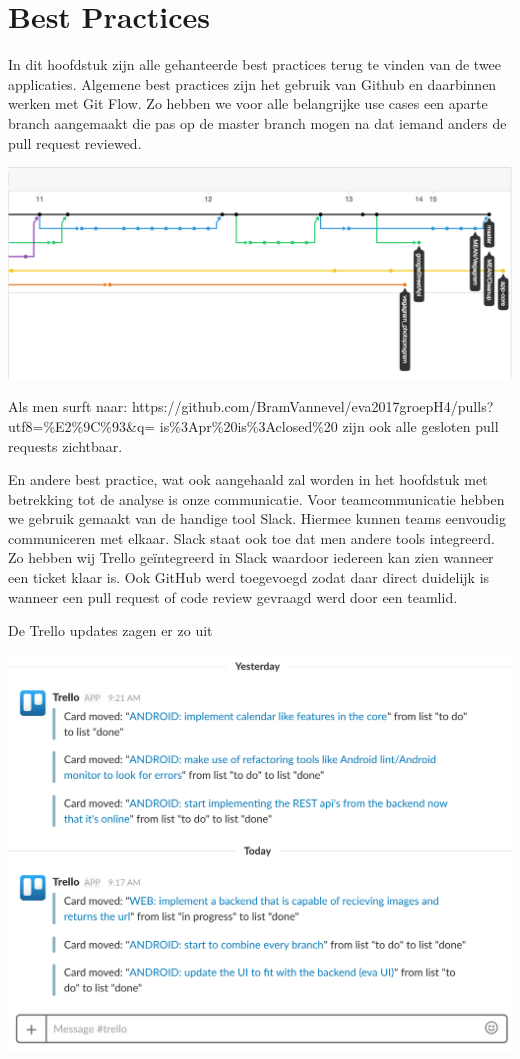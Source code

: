 \chapter{Best Practices}
\label{ch:bp}

In dit hoofdstuk zijn alle gehanteerde best practices terug te vinden van de twee applicaties. Algemene best practices zijn het gebruik van Github en daarbinnen werken met Git Flow. Zo hebben we voor alle belangrijke use cases een aparte branch aangemaakt die pas op de master branch mogen na dat iemand anders de pull request reviewed.

\includegraphics[width=15cm]{img/branches.png}

Als men surft naar:
https://github.com/BramVannevel/eva2017groepH4/pulls?utf8=\%E2\%9C\%93\&q=
is\%3Apr\%20is\%3Aclosed\%20
zijn ook alle gesloten pull requests zichtbaar.

En andere best practice, wat ook aangehaald zal worden in het hoofdstuk met betrekking tot de analyse is onze communicatie. Voor teamcommunicatie hebben we gebruik gemaakt van de handige tool Slack. Hiermee kunnen teams eenvoudig communiceren met elkaar. Slack staat ook toe dat men andere tools integreerd. Zo hebben wij Trello geïntegreerd in Slack waardoor iedereen kan zien wanneer een ticket klaar is. Ook GitHub werd toegevoegd zodat daar direct duidelijk is wanneer een pull request of code review gevraagd werd door een teamlid.

De Trello updates zagen er zo uit

\includegraphics[width=15cm]{img/slack.png}

